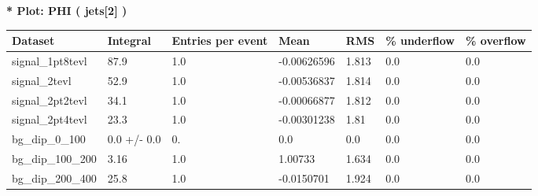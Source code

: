 \documentclass[a4paper, 10pt]{article}
\begin{document}
\textbf{* Plot: PHI ( jets[2] ) }\\
   \begin{table}[H]
  \begin{center}
    \begin{tabular}{|m{23.0mm}|m{23.0mm}|m{18.0mm}|m{19.0mm}|m{19.0mm}|m{19.0mm}|m{19.0mm}|}
      \hline
      {\cellcolor{yellow}         Dataset}& {\cellcolor{yellow}         Integral}& {\cellcolor{yellow}         Entries per event}& {\cellcolor{yellow}         Mean}& {\cellcolor{yellow}         RMS}& {\cellcolor{yellow}         \% underflow}& {\cellcolor{yellow}         \% overflow}\\
      \hline
      {\cellcolor{white}         signal\_1pt8tevl}& {\cellcolor{white}         87.9}& {\cellcolor{white}         1.0}& {\cellcolor{white}         -0.00626596}& {\cellcolor{white}         1.813}& {\cellcolor{green}         0.0}& {\cellcolor{green}         0.0}\\
      \hline
      {\cellcolor{white}         signal\_2tevl}& {\cellcolor{white}         52.9}& {\cellcolor{white}         1.0}& {\cellcolor{white}         -0.00536837}& {\cellcolor{white}         1.814}& {\cellcolor{green}         0.0}& {\cellcolor{green}         0.0}\\
      \hline
      {\cellcolor{white}         signal\_2pt2tevl}& {\cellcolor{white}         34.1}& {\cellcolor{white}         1.0}& {\cellcolor{white}         -0.00066877}& {\cellcolor{white}         1.812}& {\cellcolor{green}         0.0}& {\cellcolor{green}         0.0}\\
      \hline
      {\cellcolor{white}         signal\_2pt4tevl}& {\cellcolor{white}         23.3}& {\cellcolor{white}         1.0}& {\cellcolor{white}         -0.00301238}& {\cellcolor{white}         1.81}& {\cellcolor{green}         0.0}& {\cellcolor{green}         0.0}\\
      \hline
      {\cellcolor{white}         bg\_dip\_0\_100}& {\cellcolor{white}         0.0 +/\-- 0.0}& {\cellcolor{white}         0.}& {\cellcolor{white}         0.0}& {\cellcolor{white}         0.0}& {\cellcolor{green}         0.0}& {\cellcolor{green}         0.0}\\
      \hline
      {\cellcolor{white}         bg\_dip\_100\_200}& {\cellcolor{white}         3.16}& {\cellcolor{white}         1.0}& {\cellcolor{white}         1.00733}& {\cellcolor{white}         1.634}& {\cellcolor{green}         0.0}& {\cellcolor{green}         0.0}\\
      \hline
      {\cellcolor{white}         bg\_dip\_200\_400}& {\cellcolor{white}         25.8}& {\cellcolor{white}         1.0}& {\cellcolor{white}         -0.0150701}& {\cellcolor{white}         1.924}& {\cellcolor{green}         0.0}& {\cellcolor{green}         0.0}\\

\end{tabular}
\end{center}
\end{table}
\end{document}
